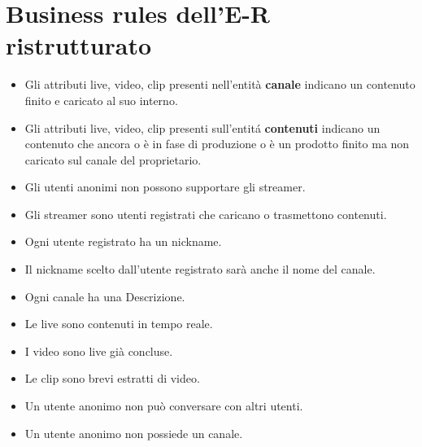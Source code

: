 \section{Business rules dell'E-R ristrutturato }
\begin{itemize}
    \item Gli attributi live, video, clip presenti nell'entità \textbf{canale} indicano un contenuto finito e caricato al suo interno.
    \item Gli attributi live, video, clip presenti sull'entitá \textbf{contenuti} indicano un contenuto che ancora o è in fase di produzione o è un prodotto finito ma non caricato sul canale del proprietario. 
    \item Gli utenti anonimi non possono supportare gli streamer. 
    \item Gli streamer sono utenti registrati che caricano  o trasmettono contenuti. 
    \item Ogni utente registrato ha un nickname. 
    \item Il nickname scelto dall'utente registrato sarà anche il nome del canale. 
    \item Ogni canale ha una Descrizione. 
    \item Le live sono contenuti in tempo reale.
    \item I video sono live già concluse. 
    \item Le clip sono brevi estratti di video. 
    \item Un utente anonimo non può conversare con altri utenti.
    \item Un utente anonimo non possiede un canale. 
\end{itemize}
